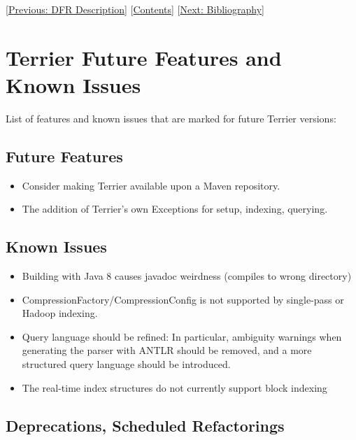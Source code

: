 {[}\href{dfr_description.html}{Previous: DFR Description}{]}
{[}\href{index.html}{Contents}{]} {[}\href{bibliography.html}{Next:
Bibliography}{]}\\

\section{Terrier Future Features and Known
Issues}\label{terrier-future-features-and-known-issues}

List of features and known issues that are marked for future Terrier
versions:\\

\subsection{Future Features}\label{future-features}

\begin{itemize}
\tightlist
\item
  Consider making Terrier available upon a Maven repository.
\item
  The addition of Terrier's own Exceptions for setup, indexing,
  querying.
\end{itemize}

\subsection{Known Issues}\label{known-issues}

\begin{itemize}
\tightlist
\item
  Building with Java 8 causes javadoc weirdness (compiles to wrong
  directory)
\item
  CompressionFactory/CompressionConfig is not supported by single-pass
  or Hadoop indexing.
\item
  Query language should be refined: In particular, ambiguity warnings
  when generating the parser with ANTLR should be removed, and a more
  structured query language should be introduced.
\item
  The real-time index structures do not currently support block indexing
\end{itemize}

\subsection{Deprecations, Scheduled
Refactorings}\label{deprecations-scheduled-refactorings}


